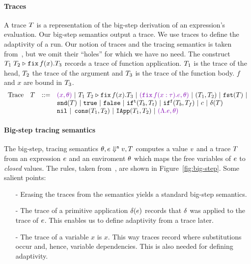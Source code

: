\documentclass[a4paper,11pt]{article}
\newcommand{\wq}[1]{\textcolor[rgb]{.50,0.0,0.7}{ #1}}
\theoremstyle{definition}
\begin{document}
\paragraph{Traces}
A trace $T$ is a representation of the big-step derivation of an
expression's evaluation. Our big-step semantics output a trace. We use
traces to define the adaptivity of a run. Our notion of traces and the
tracing semantics is taken from~\cite[Section 4]{perera:dep}, but we
omit their ``holes'' for which we have no need. The construct
$T_1 \; T_2 \mathrel{\triangleright} {\mathop{\mathtt{fix}} f(x).T_3}$ records a trace of function
application. $T_1$ is the trace of the head, $T_2$ the trace of
the argument and $T_3$ is the trace of the function body. $f$ and
$x$ are bound in $T_3$.
%
\[\begin{array}{llll}
\mbox{Trace} & \tr & ::= & \wq{(x, \env)} ~|~ \trapp{\tr_1}{\tr_2}{f}{x}{\tr_3} ~|~
\wq{ (\trfix f(x:\type).e, \env) } ~|~ (\tr_1, \tr_2) ~|~ \trprojl(\tr) ~|\\ 
%
& & & \trprojr(\tr) ~|~ \trtrue ~|~ \trfalse ~|~ \trift(\tr_b, \tr_t)
~|~ \triff(\tr_b, \tr_f) ~|~ \trconst ~|~ \trop(\tr) \\
%
& & & \trnil ~|~ \trcons (\tr_1, \tr_2) ~|~ \triapp{\tr_1}{\tr_2} ~|~
      \wq {(\eilam \expr, \env)}
\end{array}\]


\paragraph{Big-step tracing semantics}
The big-step, tracing semantics $\theta, e \mathrel{\Downarrow^{\mathsf{n}}} v, T$
computes a value $v$ and a trace $T$ from an expression $e$
and an enviroment $\theta$ which maps the free variables of $e$ to
\emph{closed} values. The rules, taken from~\cite{perera:dep}, are
shown in Figure~\ref{fig:big-step}. Some salient points:
\begin{itemize}
\item[-] Erasing the traces from the semantics yields a standard
  big-step semantics.
\item[-] The trace of a primitive application $\delta(e)$
  records that $\delta$ was applied to the trace of
  $e$. This enables us to define adaptivity from a trace later.
\item[-] The trace of a variable $x$ is $x$. This way traces record
  where substitutions occur and, hence, variable dependencies. This is
  also needed for defining adaptivity.
\end{itemize}
\end{document}
